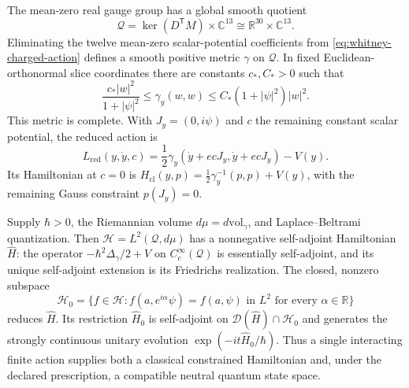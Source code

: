 \begin{theorem}
\label{thm:whitney-interacting-quantum}
The mean-zero real gauge group has a global smooth quotient
\[
 \mathcal Q=\ker(D^{\mathsf T}M)\times\mathbb C^{13}
          \cong\mathbb R^{30}\times\mathbb C^{13}.
\]
Eliminating the twelve mean-zero scalar-potential coefficients from
\eqref{eq:whitney-charged-action} defines a smooth positive metric
\(\gamma\) on \(\mathcal Q\). In fixed Euclidean-orthonormal slice
coordinates there are constants \(c_*,C_*>0\) such that
\begin{equation}
 \frac{c_*|w|^2}{1+|\psi|^2}\leq\gamma_y(w,w)
             \leq C_*(1+|\psi|^2)|w|^2.
 \label{eq:whitney-interacting-global-metric-bound}
\end{equation}
This metric is complete. With \(J_y=(0,i\psi)\)
and \(c\) the remaining constant scalar potential, the reduced action is
\begin{equation}
 L_{\mathrm{red}}(y,\dot y,c)
 =\frac12\gamma_y(\dot y+ecJ_y,\dot y+ecJ_y)-V(y).
 \label{eq:whitney-interacting-reduced-action}
\end{equation}
Its Hamiltonian at \(c=0\) is
\(H_{\mathrm{cl}}(y,p)=\tfrac12\gamma_y^{-1}(p,p)+V(y)\),
with the remaining Gauss constraint \(p(J_y)=0\).

Supply \(\hbar>0\), the Riemannian volume \(d\mu=d\mathrm{vol}_\gamma\),
and Laplace--Beltrami quantization. Then
\(\mathcal H=L^2(\mathcal Q,d\mu)\) has a nonnegative self-adjoint
Hamiltonian \(\widehat H\): the operator
\(-\hbar^2\Delta_\gamma/2+V\) on \(C_c^\infty(\mathcal Q)\)
is essentially self-adjoint, and its unique self-adjoint extension is its
Friedrichs realization.
The closed, nonzero subspace
\begin{equation}
 \mathcal H_0=\{f\in\mathcal H:
 f(a,e^{i\alpha}\psi)=f(a,\psi)\text{ in }L^2
                    \text{ for every }\alpha\in\mathbb R\}
 \label{eq:whitney-interacting-neutral-hilbert}
\end{equation}
reduces \(\widehat H\). Its restriction \(\widehat H_0\) is
self-adjoint on \(\mathcal D(\widehat H)\cap\mathcal H_0\)
and generates the strongly continuous unitary evolution
\(\exp(-it\widehat H_0/\hbar)\). Thus a single interacting finite
action supplies both a classical constrained Hamiltonian and, under the
declared prescription, a compatible neutral quantum state space.
\end{theorem}

